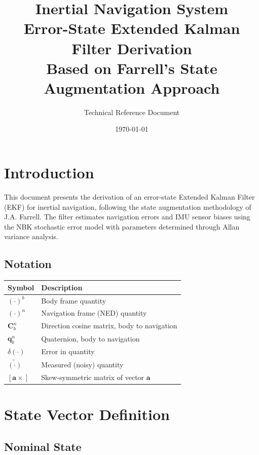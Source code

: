 \documentclass[11pt,a4paper]{article}
\title{\textbf{Inertial Navigation System}\\[0.5em]
\Large Error-State Extended Kalman Filter Derivation\\[0.3em]
\large Based on Farrell's State Augmentation Approach}
\author{Technical Reference Document}
\date{\today}
\newcommand{\mat}[1]{\mathbf{#1}}
\newcommand{\vect}[1]{\boldsymbol{#1}}
\newcommand{\quat}[1]{\mathbf{#1}}
\newcommand{\skewmat}[1]{\left[#1 \times\right]}
\begin{document}
\maketitle
\tableofcontents
\newpage

\section{Introduction}

This document presents the derivation of an error-state Extended Kalman Filter (EKF) for inertial navigation, following the state augmentation methodology of J.A. Farrell. The filter estimates navigation errors and IMU sensor biases using the NBK stochastic error model with parameters determined through Allan variance analysis.

\subsection{Notation}

\begin{tabular}{ll}
    \toprule
    Symbol & Description \\
    \midrule
    $(\cdot)^b$ & Body frame quantity \\
    $(\cdot)^n$ & Navigation frame (NED) quantity \\
    $\mat{C}_b^n$ & Direction cosine matrix, body to navigation \\
    $\quat{q}_b^n$ & Quaternion, body to navigation \\
    $\delta(\cdot)$ & Error in quantity \\
    $\tilde{(\cdot)}$ & Measured (noisy) quantity \\
    $\skewmat{\vect{a}}$ & Skew-symmetric matrix of vector $\vect{a}$ \\
    \bottomrule
\end{tabular}

\section{State Vector Definition}

\subsection{Nominal State}
\end{document}
